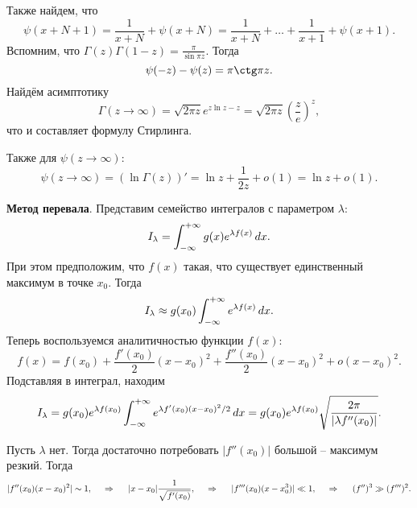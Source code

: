 Также найдем, что
\begin{equation*}
    \psi(x + N + 1) = \frac{1}{x + N} + \psi(x+ N) = \frac{1}{x+N} + \ldots + \frac{1}{x+1} + \psi(x+1).
\end{equation*}
Вспомним, что $\Gamma(z) \Gamma(1-z) = \frac{\pi}{\sin \pi z}$. Тогда
\begin{equation*}
    \psi(-z) - \psi(z) = \pi \ctg \pi z.
\end{equation*}
Найдём асимптотику 
\begin{equation*}
    \Gamma(z \to \infty) = \sqrt{2 \pi z} e^{z \ln z - z} = \sqrt{2 \pi z} \left(\frac{z}{e}\right)^{z},
\end{equation*}
что и составляет формулу Стирлинга. 

Также для $\psi(z\to \infty)$:
\begin{equation*}
    \psi(z\to \infty) = \left(\ln \Gamma(z)\right)' = \ln z + \frac{1}{2z} + o(1) = \ln z + o(1).
\end{equation*}




\textbf{Метод перевала}.  Представим семейство интегралов с параметром $\lambda$:
\begin{equation*}
    I_\lambda = \int_{-\infty}^{+\infty} g(x) e^{\lambda f(x)} \, d x.
\end{equation*}
При этом предположим, что $f(x)$ такая, что существует единственный максимум в точке $x_0$. Тогда
\begin{equation*}
    I_\lambda \approx g(x_0) \int_{-\infty}^{+\infty} e^{\lambda f(x)} \, d x.
\end{equation*}
Теперь воспользуемся аналитичностью функции $f(x)$:
\begin{equation*}
    f(x) = f(x_0) + \frac{f'(x_0)}{2} (x-x_0)^2 + \frac{f''(x_0)}{2} (x-x_0)^2 + o(x-x_0)^2.
\end{equation*}
Подставляя в интеграл, находим
\begin{equation*}
    I_\lambda=  g(x_0) e^{\lambda f(x_0)} \int_{-\infty}^{+\infty} e^{\lambda f'(x_0) (x-x_0)^2/2} \, d x = g(x_0) e^{\lambda f(x_0)} \sqrt{\frac{2\pi}{|\lambda f'' (x_0) |}}.
\end{equation*}

Пусть $\lambda$ нет. Тогда достаточно потребовать $|f''(x_0)|$ большой -- максимум резкий. 
Тогда
\begin{equation*}
    |f''(x_0) (x-x_0)^2| \sim 1,
    \hspace{0.5cm} \Rightarrow \hspace{0.5cm}   
    |x-x_0| \frac{1}{\sqrt{f'(x_0)}},
    \hspace{0.5cm} \Rightarrow \hspace{0.5cm}   
    |f'''(x_0) (x-x_0^3)| \ll 1,
    \hspace{0.5cm} \Rightarrow \hspace{0.5cm}
    (f'')^3 \gg (f''')^2.
\end{equation*}

